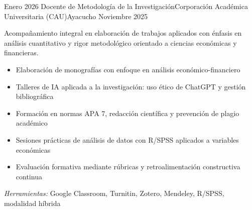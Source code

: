 \experience
{Enero 2026} {Docente de Metodología de la Investigación}{Corporación Académica Universitaria (CAU)}{Ayacucho}
{Noviembre 2025} {
	Acompañamiento integral en elaboración de trabajos aplicados con énfasis en análisis cuantitativo y rigor metodológico orientado a ciencias económicas y financieras.
	\begin{itemize}
		\item Elaboración de monografías con enfoque en análisis económico-financiero
		\item Talleres de IA aplicada a la investigación: uso ético de ChatGPT y gestión bibliográfica
		\item Formación en normas APA 7, redacción científica y prevención de plagio académico
		\item Sesiones prácticas de análisis de datos con R/SPSS aplicados a variables económicas
		\item Evaluación formativa mediante rúbricas y retroalimentación constructiva continua
	\end{itemize}
}
{\footnotesize{\emph{Herramientas:} Google Classroom, Turnitin, Zotero, Mendeley, R/SPSS, modalidad híbrida}}
